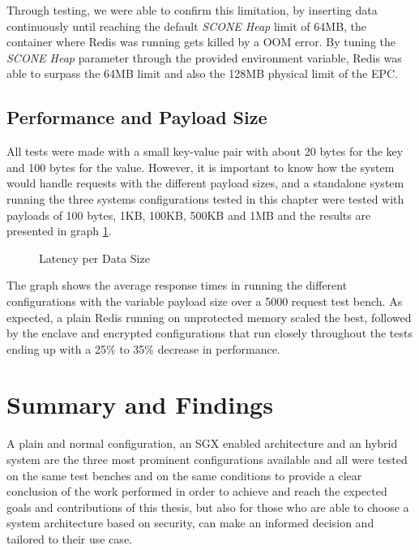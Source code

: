 Through testing, we were able to confirm this limitation, by inserting data continuously until reaching the default \textit{SCONE Heap} limit of 64\gls{MB}, the container where Redis was running gets killed by a \gls{OOM} error. By tuning the \textit{SCONE Heap} parameter through the provided environment variable, Redis was able to surpass the 64\gls{MB} limit and also the 128\gls{MB} physical limit of the \gls{EPC}.

\subsection{Performance and Payload Size}
\label{ssec:performance_and_payload_size}

All tests were made with a small key-value pair with about 20 bytes for the key and 100 bytes for the value. However, it is important to know how the system would handle requests with the different payload sizes, and a standalone system running the three systems configurations tested in this chapter were tested with payloads of 100 bytes, 1KB, 100KB, 500KB and 1MB and the results are presented in graph \ref{fig:latency_per_data_size}.

\begin{figure}[htbp]
  \caption{Latency per Data Size}
  \label{fig:latency_per_data_size}
\end{figure}

The graph shows the average response times in running the different configurations with the variable payload size over a 5000 request test bench. As expected, a plain Redis running on unprotected memory scaled the best, followed by the enclave and encrypted configurations that run closely throughout the tests ending up with a 25\% to 35\% decrease in performance.

\section{ Summary and Findings}
\label{sec:summary_and_findings}

A plain and normal configuration, an \gls{SGX} enabled architecture and an hybrid system are the three most prominent configurations available and all were tested on the same test benches and on the same conditions to provide a clear conclusion of the work performed in order to achieve and reach the expected goals and contributions of this thesis, but also for those who are able to choose a system architecture based on security, can make an informed decision and tailored to their use case.

